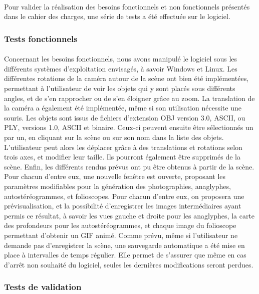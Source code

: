 \paragraph{}
Pour valider la réalisation des besoins fonctionnels et non fonctionnels présentés dans le cahier des charges, une série de tests a été effectuée sur le logiciel.

\subsubsection{Tests fonctionnels}
\paragraph{}
Concernant les besoins fonctionnels, nous avons manipulé le logiciel sous les différents systèmes d'exploitation envisagés, à savoir Windows et Linux.
Les différentes rotations de la caméra autour de la scène ont bien été implémentées, permettant à l'utilisateur de voir les objets qui y sont placés sous différents angles, et de s'en rapprocher ou de s'en éloigner grâce au zoom. La translation de la caméra a également été implémentée, même si son utilisation nécessite une souris.
Les objets sont issus de fichiers d'extension OBJ version 3.0, ASCII, ou PLY, versions 1.0, ASCII et binaire. Ceux-ci peuvent ensuite être sélectionnés un par un, en cliquant sur la scène ou sur son nom dans la liste des objets. L'utilisateur peut alors les déplacer grâce à des translations et rotations selon trois axes, et modifier leur taille. Ils pourront également être supprimés de la scène.
Enfin, les différents rendus prévus ont pu être obtenus à partir de la scène. Pour chacun d'entre eux, une nouvelle fenêtre est ouverte, proposant les paramètres modifiables pour la génération des photographies, anaglyphes, autostéréogrammes, et folioscopes. Pour chacun d'entre eux, on proposera une prévisualisation, et la possibilité d'enregistrer les images intermédiaires ayant permis ce résultat, à savoir les vues gauche et droite pour les anaglyphes, la carte des profondeurs pour les autostéréogrammes, et chaque image du folioscope permettant d'obtenir un GIF animé.
Comme prévu, même si l'utilisateur ne demande pas d'enregistrer la scène, une sauvegarde automatique a été mise en place à intervalles de temps régulier. Elle permet de s'assurer que même en cas d'arrêt non souhaité du logiciel, seules les dernières modifications seront perdues.

\subsubsection{Tests de validation}
